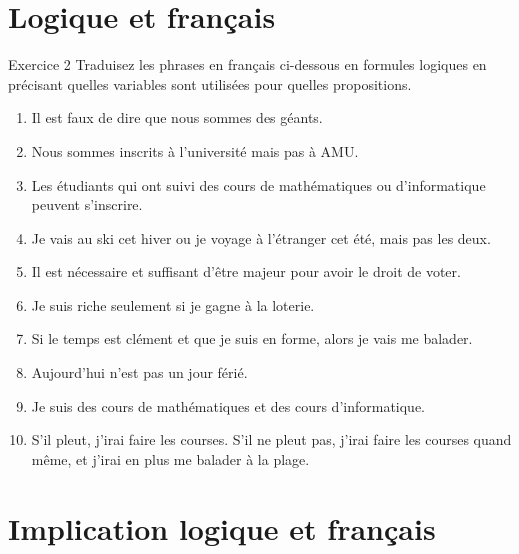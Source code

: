 \documentclass[a4paper,11pt]{article}
\begin{document}
\section{Logique et français}

\begin{exercisebox}{Exercice 2}
Traduisez les phrases en français ci-dessous en formules logiques en précisant quelles variables sont utilisées pour quelles propositions.

\begin{enumerate}
    \item Il est faux de dire que nous sommes des géants.
    \item Nous sommes inscrits à l'université mais pas à AMU.
    \item Les étudiants qui ont suivi des cours de mathématiques ou d'informatique peuvent s'inscrire.
    \item Je vais au ski cet hiver ou je voyage à l'étranger cet été, mais pas les deux.
    \item Il est nécessaire et suffisant d'être majeur pour avoir le droit de voter.
    \item Je suis riche seulement si je gagne à la loterie.
    \item Si le temps est clément et que je suis en forme, alors je vais me balader.
    \item Aujourd'hui n'est pas un jour férié.
    \item Je suis des cours de mathématiques et des cours d'informatique.
    \item S'il pleut, j'irai faire les courses. S'il ne pleut pas, j'irai faire les courses quand même, et j'irai en plus me balader à la plage.
\end{enumerate}
\end{exercisebox}

\section{Implication logique et français}
\end{document}
